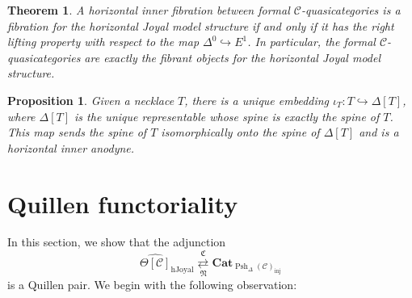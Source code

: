 \documentclass{amsart}
\numberwithin{equation}{section}
\theoremstyle{plain}   %
\newtheorem{thm}[subsection]{Theorem}
\newtheorem{prop}[subsection]{Proposition}
\theoremstyle{remark}
\theoremstyle{plain}
\newcommand{\Cat}{\ensuremath{\mathbf{Cat}}}
\newcommand{\C}{\ensuremath{\mathcal{C}}}
\newcommand{\cellset}{\ensuremath{\widehat{\Theta[\mathcal{C}]}}}
\newcommand{\spsh}{\ensuremath{\operatorname{Psh}_\Delta(\mathcal{C})}}
\begin{document}
\begin{thm}\label{isofibrations}
	A horizontal inner fibration between formal \(\C\)-quasicategories is a fibration for the horizontal Joyal model structure if and only if it has the right lifting property with respect to the map \(\Delta^0\hookrightarrow E^1\).  In particular, the formal \(\C\)-quasicategories are exactly the fibrant objects for the horizontal Joyal model structure.
\end{thm}

\begin{prop}
	Given a necklace \(T\), there is a unique embedding \(\iota_T:T\hookrightarrow \Delta[T]\), where \(\Delta[T]\) is the unique representable whose spine is exactly the spine of \(T\).  This map sends the spine of \(T\) isomorphically onto the spine of \(\Delta[T]\) and is a horizontal inner anodyne.
\end{prop}

\section{Quillen functoriality}
In this section, we show that the adjunction \[\cellset_{\mathrm{hJoyal}} \underset{\mathfrak{N}}{\overset{\mathfrak{C}}{\rightleftarrows}} \Cat_{\spsh_{\mathrm{inj}}}\] is a Quillen pair. We begin with the following observation:
\end{document}
